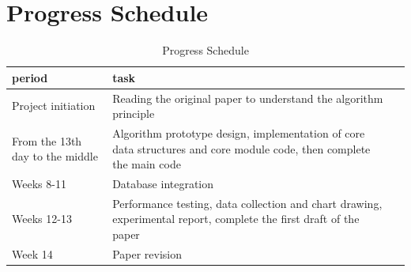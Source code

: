 \documentclass[a4paper,12pt]{ctexart}
\begin{document}
\section{Progress Schedule}
\begin{table}[H]
\centering
\caption{Progress Schedule}
\begin{tabular}{lll}
\toprule
\textbf{period} & \textbf{task}  \\
\midrule
Project initiation & Reading the original paper to understand the algorithm principle \\
From the 13th day to the middle & Algorithm prototype design, implementation of core data structures and core module code, then complete the main code \\
Weeks 8-11 & Database integration \\
Weeks 12-13 & Performance testing, data collection and chart drawing, experimental report, complete the first draft of the paper \\
Week 14 & Paper revision \\
\bottomrule
\end{tabular}
\end{table}

\printbibliography[title={References}]
\end{document}
